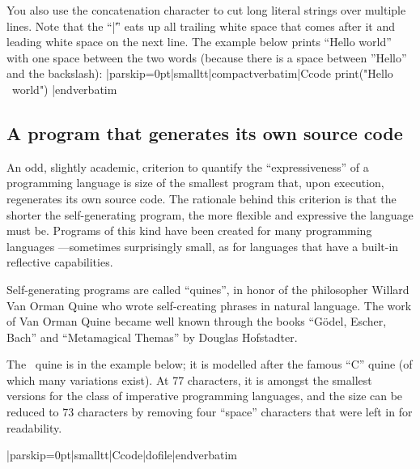 You also use the concatenation character to cut long literal strings over
multiple lines. Note that the ``|\|'' eats up all trailing white space that
comes after it and leading white space on the next line. The example below
prints ``Hello world'' with one space between the two words (because there is
a space between ''Hello'' and the backslash):
\listingx\verbatim|parskip=0pt|smalltt|compactverbatim|Ccode
print("Hello \
      world")
|endverbatim\endlistingx

\subsection{A program that generates its own source code}
An odd, slightly academic, criterion to quantify the ``expressiveness'' of a programming
language is size of the smallest program that, upon execution, regenerates its
own source code. The rationale behind this criterion is that the shorter the
self-generating program, the more flexible and expressive the language must be.
Programs of this kind have been created for many programming languages ---sometimes
surprisingly small, as for languages that have a built-in reflective capabilities.

   
Self-generating programs are called ``quines'', in honor of the philosopher
Willard Van Orman Quine who wrote self-creating phrases in natural language. The
work of Van Orman Quine became well known through the books ``G\"odel, Escher,
Bach'' and ``Metamagical Themas'' by Douglas Hofstadter.

The \Small\ quine is in the example below; it is modelled after the famous ``C''
quine (of which many variations exist). At 77 characters, it is amongst the
smallest versions for the class of imperative programming languages, and the size
can be reduced to 73 characters by removing four ``space'' characters that were
left in for readability.

\bigskip{}
\verbatim|parskip=0pt|smalltt|Ccode|dofile|endverbatim\endlistingx
